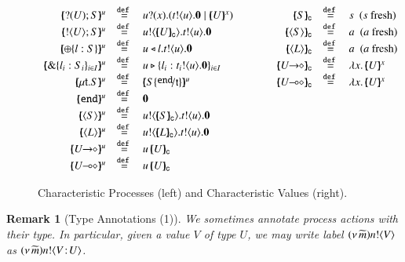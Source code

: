 \documentclass[preprint,11pt]{elsarticle}
\newtheorem{remark}{Remark}[section]
\begin{document}
{%
\begin{figure}[t!]
\[
	\begin{array}{rclcrcl}
		\mapchar{\btinp{U} S}{u}
		&\defeq&
		\binp{u}{x} (\bout{t}{u} \inact \Par \mapchar{U}{x})
		&\qquad &
		\omapchar{S}  & \defeq &  s ~~ (s \textrm{ fresh})
		\\
		\mapchar{\btout{U} S}{u}
		&\defeq&
		\bout{u}{\omapchar{U}} \bout{t}{u} \inact
		&&
		\omapchar{\chtype{S}} &\defeq& a ~~ (a \textrm{ fresh})
		\\
		\mapchar{\btsel{l : S}}{u}
		& \defeq &
		\bsel{u}{l} \bout{t}{u} \inact
		&&
		\omapchar{\chtype{L}} &\defeq&a ~~ (a \textrm{ fresh})
		\\
		\mapchar{\btbra{l_i: S_i}_{i \in I}}{u}
		& \defeq &
		\bbra{u}{l_i: \bout{t_i}{u} \inact}_{i \in I}		 
		&&
		\omapchar{\shot{U}} &\defeq& \abs{x}{\mapchar{U}{x}}
		\\
		 
%
		\mapchar{ \trec{t}{S} }{u} &\defeq& \mapchar{S \subst{\tinact}{\vart{t}} }{u}

		&&
		\omapchar{\lhot{U}} & \defeq &  \abs{x}{\mapchar{U}{x}}
		\\
		\mapchar{\tinact}{u}
		& \defeq &
		\inact
		\\
		\mapchar{\chtype{S}}{u} 
		&\defeq&
		\bout{u}{\omapchar{S}} \bout{t}{u} \inact		 
		\\
		\mapchar{\chtype{L}}{u}
		&\defeq&
		 \bout{u}{\omapchar{L}} \bout{t}{u} \inact 
		\\
		\mapchar{\shot{U}}{u}
		&\defeq& 
		\appl{u}{\omapchar{U}}
		\\
		\mapchar{\lhot{U}}{u}
		&\defeq &
		\appl{u}{\omapchar{U}}
	\end{array}
	\]
\caption{Characteristic Processes (left) and Characteristic Values (right).\label{fig:char}}
%
\end{figure}


\begin{remark}[Type Annotations (1)]\label{r:anntypes}
We sometimes annotate process actions with their type. In particular, 
given a value $V$ of type $U$, we may write label
$(\nu\, \widetilde{m}) n ! \langle V \rangle$
as $(\nu\, \widetilde{m}) n ! \langle V \! : \! U \rangle$.
\end{remark}

}
\end{document}
